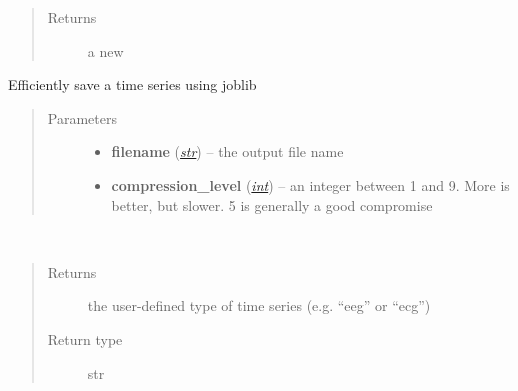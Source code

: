 \documentclass[letterpaper,10pt,english]{sphinxmanual}
\begin{document}
\begin{fulllineitems}
\begin{fulllineitems}
\begin{quote}
\begin{description}
\item[{Returns}] \leavevmode
a new {\hyperref[pyrem.time_series:pyrem.time_series.BiologicalTimeSeries]{}}

\end{description}\end{quote}

\end{fulllineitems}


\begin{fulllineitems}
\label{pyrem.time_series:pyrem.time_series.BiologicalTimeSeries.save}
Efficiently save a time series using joblib
\begin{quote}\begin{description}
\item[{Parameters}] \leavevmode\begin{itemize}
\item {} 
\textbf{filename} (\href{http://docs.python.org/2.7/library/functions.html\#str}{\emph{str}}) -- the output file name

\item {} 
\textbf{compression\_level} (\href{http://docs.python.org/2.7/library/functions.html\#int}{\emph{int}}) -- an integer between 1 and 9. More is better, but slower. 5 is generally a good compromise

\end{itemize}

\end{description}\end{quote}

\end{fulllineitems}


\begin{fulllineitems}
\label{pyrem.time_series:pyrem.time_series.BiologicalTimeSeries.type}~\begin{quote}\begin{description}
\item[{Returns}] \leavevmode
the user-defined type of time series (e.g. ``eeg'' or ``ecg'')

\item[{Return type}] \leavevmode
str

\end{description}\end{quote}

\end{fulllineitems}


\end{fulllineitems}
\end{document}
